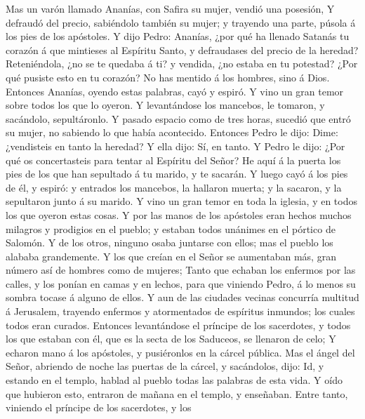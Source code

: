  Mas un varón llamado Ananías, con Safira su mujer, vendió
una posesión,  Y defraudó del precio, sabiéndolo también su
mujer; y trayendo una parte, púsola á los pies de los apóstoles.
 Y dijo Pedro: Ananías, ¿por qué ha llenado Satanás tu
corazón á que mintieses al Espíritu Santo, y defraudases del precio de
la heredad?  Reteniéndola, ¿no se te quedaba á ti? y
vendida, ¿no estaba en tu potestad? ¿Por qué pusiste esto en tu corazón?
No has mentido á los hombres, sino á Dios.  Entonces
Ananías, oyendo estas palabras, cayó y espiró. Y vino un gran temor
sobre todos los que lo oyeron.  Y levantándose los mancebos,
le tomaron, y sacándolo, sepultáronlo.  Y pasado espacio
como de tres horas, sucedió que entró su mujer, no sabiendo lo que había
acontecido.  Entonces Pedro le dijo: Dime: ¿vendisteis en
tanto la heredad? Y ella dijo: Sí, en tanto.  Y Pedro le
dijo: ¿Por qué os concertasteis para tentar al Espíritu del Señor? He
aquí á la puerta los pies de los que han sepultado á tu marido, y te
sacarán.  Y luego cayó á los pies de él, y espiró: y
entrados los mancebos, la hallaron muerta; y la sacaron, y la sepultaron
junto á su marido.  Y vino un gran temor en toda la
iglesia, y en todos los que oyeron estas cosas.  Y por las
manos de los apóstoles eran hechos muchos milagros y prodigios en el
pueblo; y estaban todos unánimes en el pórtico de Salomón. 
Y de los otros, ninguno osaba juntarse con ellos; mas el pueblo los
alababa grandemente.  Y los que creían en el Señor se
aumentaban más, gran número así de hombres como de mujeres;
 Tanto que echaban los enfermos por las calles, y los
ponían en camas y en lechos, para que viniendo Pedro, á lo menos su
sombra tocase á alguno de ellos.  Y aun de las ciudades
vecinas concurría multitud á Jerusalem, trayendo enfermos y atormentados
de espíritus inmundos; los cuales todos eran curados. 
Entonces levantándose el príncipe de los sacerdotes, y todos los que
estaban con él, que es la secta de los Saduceos, se llenaron de celo;
 Y echaron mano á los apóstoles, y pusiéronlos en la cárcel
pública.  Mas el ángel del Señor, abriendo de noche las
puertas de la cárcel, y sacándolos, dijo:  Id, y estando en
el templo, hablad al pueblo todas las palabras de esta vida.
 Y oído que hubieron esto, entraron de mañana en el templo,
y enseñaban. Entre tanto, viniendo el príncipe de los sacerdotes, y los
